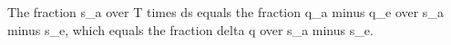 The fraction s_a over T times ds equals the fraction q_a minus q_e over s_a minus s_e, which equals the fraction delta q over s_a minus s_e.